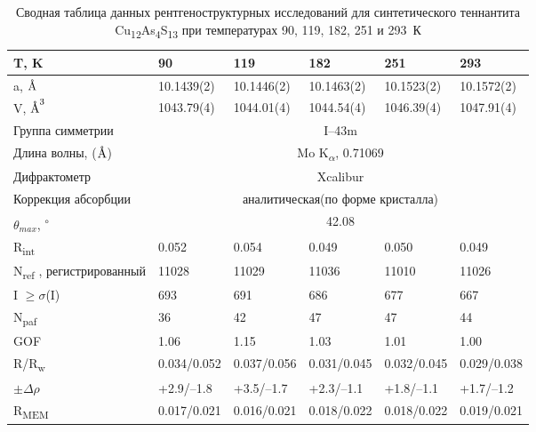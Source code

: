 \begin{landscape}
\begin{table} [htbp]
\centering
\caption{Сводная таблица данных рентгеноструктурных исследований для синтетического теннантита Cu\textsubscript{12}As\textsubscript{4}S\textsubscript{13} при температурах 90, 119, 182, 251 и 293~К}%
	\label{xray1}%
    \renewcommand{\arraystretch}{1.5}
	\begin{tabular}{@{}@{\extracolsep{20pt}}llllll@{}}
 \toprule     %
T, K                       & 90          & 119         & 182         & 251         & 293         \\
   \midrule
a, $\mbox{\normalfont\AA}$                       & 10.1439(2)  & 10.1446(2)  & 10.1463(2)  & 10.1523(2)  & 10.1572(2)  \\ \hline
V, $\mbox{\normalfont\AA}^3$                      & 1043.79(4)      & 1044.01(4)      & 1044.54(4)      & 1046.39(4)      & 1047.91(4)      \\ \hline
Группа симметрии                     &\multicolumn{5}{c}{ I–43m  }                                         \\ \hline
Длина волны, ($\mbox{\normalfont\AA}$) & \multicolumn{5}{c}{Mo K\textsubscript{$\alpha$}, 0.71069 } \\ \hline
Дифрактометр             & \multicolumn{5}{c}{Xcalibur}                                       \\ \hline
Коррекция абсорбции      & \multicolumn{5}{c}{аналитическая(по форме кристалла)} \\ \hline
$\theta_{max}$,\textsuperscript{ $\circ$ }                 &  \multicolumn{5}{c}{42.08 } \\ \hline
R\textsubscript{int}                       & 0.052       & 0.054       & 0.049       & 0.050       & 0.049       \\ \hline
N\textsubscript{ref} , регистрированный           & 11028       & 11029       & 11036       & 11010       & 11026       \\ \hline
I $\geq \sigma$(I)                  & 693         & 691         & 686         & 677         & 667         \\ \hline
N\textsubscript{paf}                       & 36          & 42          & 47          & 47          & 44          \\ \hline
GOF                        & 1.06        & 1.15        & 1.03        & 1.01        & 1.00        \\ \hline
R/R\textsubscript{w}                     & 0.034/0.052 & 0.037/0.056 & 0.031/0.045 & 0.032/0.045 & 0.029/0.038 \\ \hline
$\pm\Delta\rho   $                     & +2.9/–1.8   & +3.5/–1.7   & +2.3/–1.1   & +1.8/–1.1   & +1.7/–1.2   \\ \hline
R\textsubscript{MEM}                     & 0.017/0.021 & 0.016/0.021 & 0.018/0.022 & 0.018/0.022 & 0.019/0.021\\ \hline
 \bottomrule
\end{tabular}
\end{table}
\end{landscape}


